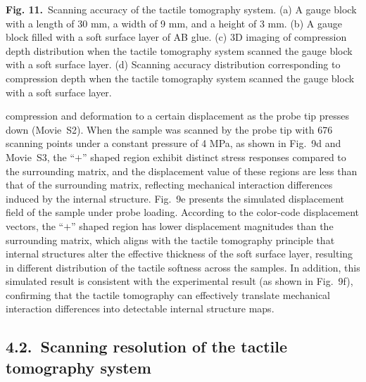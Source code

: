 \documentclass[11pt]{article}
\begin{document}
\vspace{0.4em}

\textbf{Fig. 11.}\ Scanning accuracy of the tactile tomography
system. (a) A gauge block with a length of 30 mm, a width of 9 mm,
and a height of 3 mm. (b) A gauge block filled with a soft surface
layer of AB glue. (c) 3D imaging of compression depth distribution
when the tactile tomography system scanned the gauge block with a
soft surface layer. (d) Scanning accuracy distribution
corresponding to compression depth when the tactile tomography
system scanned the gauge block with a soft surface layer.

\vspace{0.6em}

compression and deformation to a certain displacement as the probe
tip presses down (Movie~S2). When the sample was scanned by the
probe tip with 676 scanning points under a constant pressure of 4
MPa, as shown in Fig.~9d and Movie~S3, the ``$+$'' shaped region
exhibit distinct stress responses compared to the surrounding
matrix, and the displacement value of these regions are less than
that of the surrounding matrix, reflecting mechanical interaction
differences induced by the internal structure. Fig.~9e presents
the simulated displacement field of the sample under probe loading.
According to the color-code displacement vectors, the ``$+$''
shaped region has lower displacement magnitudes than the surrounding
matrix, which aligns with the tactile tomography principle that
internal structures alter the effective thickness of the soft
surface layer, resulting in different distribution of the tactile
softness across the samples. In addition, this simulated result is
consistent with the experimental result (as shown in Fig.~9f),
confirming that the tactile tomography can effectively translate
mechanical interaction differences into detectable internal
structure maps.

\subsection*{4.2.\ Scanning resolution of the tactile tomography system}
\end{document}
